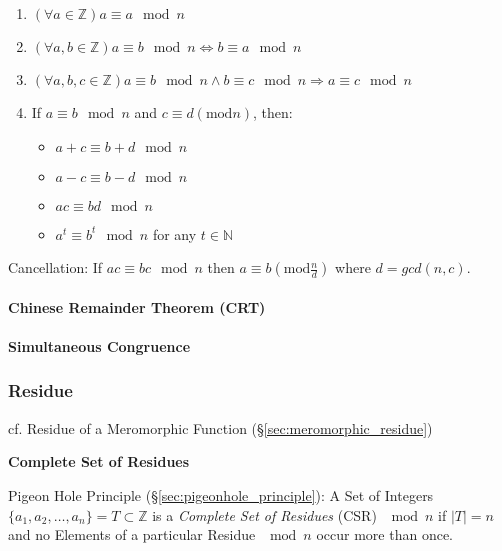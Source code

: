 \begin{enumerate}

  \item $(\forall a \in \mathbb{Z}) a \equiv a \mod n$

  \item $(\forall a,b \in \mathbb{Z}) a \equiv b \mod n
    \Leftrightarrow b \equiv a \mod n$

  \item $(\forall a,b,c \in \mathbb{Z}) a \equiv b \mod n
    \wedge b \equiv c \mod n \Rightarrow a \equiv c
    \mod n$

  \item
    If $a \equiv b \mod n$ and $c \equiv d (\mathrm{mod }
    n)$, then:
    \begin{itemize}
    \item $a + c \equiv b + d \mod n$
    \item $a - c \equiv b - d \mod n$
    \item $ac \equiv bd \mod n$
    \item $a^t \equiv b ^t \mod n$ for any $t \in
      \mathbb{N}$
    \end{itemize}

\end{enumerate}

Cancellation: If $ac \equiv bc \mod n$ then $a \equiv b
(\mathrm{mod } \frac{n}{d})$ where $d = gcd(n,c)$.



\paragraph{Chinese Remainder Theorem (CRT)}\label{sec:crt}\hfill

\paragraph{Simultaneous Congruence}\label{sec:simultaneous_congruence}\hfill



\subsubsection{Residue}\label{sec:residue}

\fist cf. Residue of a Meromorphic Function (\S\ref{sec:meromorphic_residue})

\textbf{Complete Set of Residues}

Pigeon Hole Principle (\S\ref{sec:pigeonhole_principle}): A Set of Integers
$\{a_1, a_2, \ldots, a_n\} = T \subset \mathbb{Z}$ is a \emph{Complete Set of
  Residues} (CSR) $\mod n$ if $|T| = n$ and no Elements of a particular Residue
$\mod n$ occur more than once.

